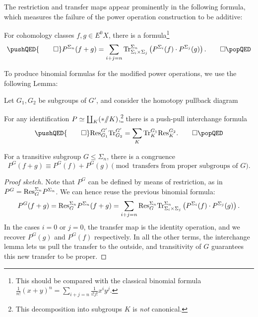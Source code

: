 The restriction and transfer maps appear prominently in the following formula, which measures the failure of the power operation construction to be additive:
\begin{lemma}
For cohomology classes \(f, g \in E^0 X\), there is a formula\footnote{This should be compared with the classical binomial formula \(\frac{1}{n!} (x + y)^n = \sum_{i+j = n} \frac{1}{i!j!} x^i y^j\).}
\[\pushQED{\qed}
P^{\Sigma_n}(f + g) = \sum_{i + j = n} \Tr_{\Sigma_i \times \Sigma_j}^{\Sigma_n}\left(P^{\Sigma_i}(f) \cdot P^{\Sigma_j}(g)\right). \qedhere
\popQED\]
\end{lemma}

\noindent To produce binomial formulas for the modified power operations, we use the following Lemma:

\begin{lemma}
Let \(G_1, G_2\) be subgroups of \(G'\), and consider the homotopy pullback diagram
\begin{center}
\end{center}
For any identification \(P \simeq \coprod_K (* /\!\!/ K)\),\footnote{This decomposition into subgroups \(K\) is \emph{not} canonical.} there is a push-pull interchange formula
\[\pushQED{\qed}
\Res_{G_1}^{G'} \Tr_{G_2}^{G'} = \sum_K \Tr^{G_1}_K \Res_K^{G_2}. \qedhere
\popQED\]
\end{lemma}

\begin{corollary}
For a transitive subgroup \(G \le \Sigma_n\), there is a congruence \[P^G(f + g) \equiv P^G(f) + P^G(g) \pmod{\text{transfers from proper subgroups of \(G\)}}.\]
\end{corollary}
\begin{proof}[Proof sketch]
Note that \(P^G\) can be defined by means of restriction, as in \(P^G = \mathrm{Res}^{\Sigma_n}_G P^{\Sigma_n}\).  We can hence reuse the previous binomial formula: \[P^G(f + g) = \mathrm{Res}^{\Sigma_n}_G P^{\Sigma_n}(f + g) = \sum_{i+j = n} \mathrm{Res}^{\Sigma_n}_G \mathrm{Tr}_{\Sigma_i \times \Sigma_j}^{\Sigma_n}\left(P^{\Sigma_i}(f) \cdot P^{\Sigma_j}(g)\right).\]  In the cases \(i = 0\) or \(j = 0\), the transfer map is the identity operation, and we recover \(P^G(g)\) and \(P^G(f)\) respectively.  In all the other terms, the interchange lemma lets us pull the transfer to the outside, and transitivity of \(G\) guarantees this new transfer to be proper.
\end{proof}

